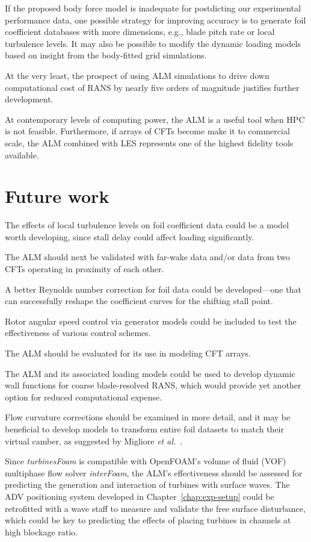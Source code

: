 
If the proposed body force model is inadequate for postdicting our experimental
performance data, one possible strategy for improving accuracy is to generate
foil coefficient databases with more dimensions, e.g., blade pitch rate or local
turbulence levels. It may also be possible to modify the dynamic loading models
based on insight from the body-fitted grid simulations.

At the very least, the prospect of using ALM simulations to drive down
computational cost of RANS by nearly five orders of magnitude justifies further
development.

At contemporary levels of computing power, the ALM is a useful tool when HPC is
not feasible. Furthermore, if arrays of CFTs become make it to commercial scale,
the ALM combined with LES represents one of the highest fidelity tools
available.


\section{Future work}

The effects of local turbulence levels on foil coefficient data could be a model
worth developing, since stall delay could affect loading significantly.

The ALM should next be validated with far-wake data and/or data from two CFTs
operating in proximity of each other.

A better Reynolds number correction for foil data could be developed---one that
can successfully reshape the coefficient curves for the shifting stall point.

Rotor angular speed control via generator models could be included to test the
effectiveness of various control schemes.

The ALM should be evaluated for its use in modeling CFT arrays.

The ALM and its associated loading models could be used to develop dynamic wall
functions for coarse blade-resolved RANS, which would provide yet another option
for reduced computational expense.

Flow curvature corrections should be examined in more detail, and it may be
beneficial to develop models to transform entire foil datasets to match their
virtual camber, as suggested by Migliore \emph{et al.}~\cite{Migliore1980}.

Since \textit{turbinesFoam} is compatible with OpenFOAM's volume of fluid (VOF)
multiphase flow solver \textit{interFoam}, the ALM's effectiveness should be
assessed for predicting the generation and interaction of turbines with surface
waves. The ADV positioning system developed in Chapter~\ref{chap:exp-setup}
could be retrofitted with a wave staff to measure and validate the free surface
disturbance, which could be key to predicting the effects of placing turbines in
channels at high blockage ratio.


